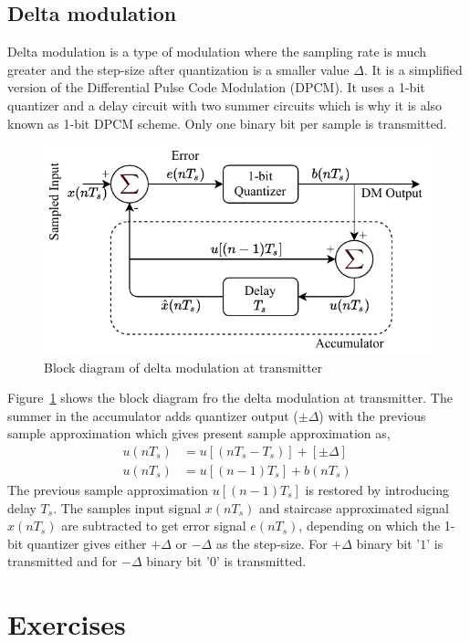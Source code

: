 \documentclass{lab_sheet}
\begin{document}
\subsection{Delta modulation}
Delta modulation is a type of modulation where the sampling rate is much greater and the step-size after quantization is a smaller value $\Delta$. It is a simplified version of the Differential Pulse Code Modulation (DPCM). It uses a 1-bit quantizer and a delay circuit with two summer circuits which is why it is also known as 1-bit DPCM scheme. Only one binary bit per sample is transmitted.
\begin{figure}[H]
    \centering
    \includegraphics{../Figures/dm_block}
    \caption{Block diagram of delta modulation at transmitter}
    \label{fig:delta_block}
\end{figure}
Figure~\ref{fig:delta_block} shows the block diagram fro the delta modulation at transmitter. The summer in the accumulator adds quantizer output ($\pm \Delta$) with the previous sample approximation which gives present sample approximation as,
\begin{equation*}
    \begin{aligned}
        u(nT_s)&=u[(nT_s-T_s)]+ [\pm \Delta]\\
        u(nT_s)&=u[(n-1)T_s]+ b(nT_s)
    \end{aligned}
\end{equation*}
The previous sample approximation $u[(n-1)T_s]$ is restored by introducing delay $T_s$. The samples input signal $x(nT_s)$ and staircase approximated signal $\hat x(nT_s)$ are subtracted to get error signal $e(nT_s)$, depending on which the 1-bit quantizer gives either $+\Delta$ or $-\Delta$ as the step-size. For $+\Delta$ binary bit '$1$' is transmitted and for $-\Delta$ binary bit '$0$' is transmitted.
\section{Exercises}
\end{document}
